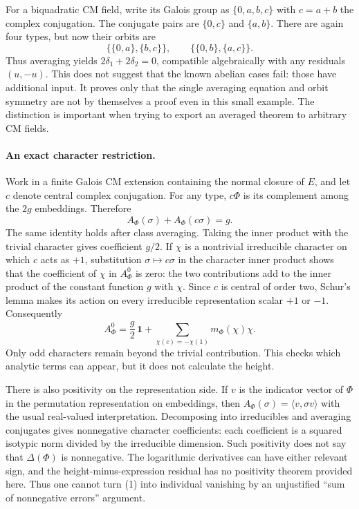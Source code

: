 \documentclass[11pt]{article}
\begin{document}
For a biquadratic CM field, write its Galois group as
$\{0,a,b,c\}$ with $c=a+b$ the complex conjugation. The conjugate
pairs are $\{0,c\}$ and $\{a,b\}$. There are again four types, but
now their orbits are
\[
 \{\{0,a\},\{b,c\}\},\qquad
 \{\{0,b\},\{a,c\}\}.                               \tag{3}
\]
Thus averaging yields $2\delta_1+2\delta_2=0$, compatible algebraically
with any residuals $(u,-u)$. This does not suggest that the known
abelian cases fail: those have additional input. It proves only that
the single averaging equation and orbit symmetry are not by themselves
a proof even in this small example. The distinction is important when
trying to export an averaged theorem to arbitrary CM fields.

\paragraph{An exact character restriction.}
Work in a finite Galois CM extension containing the normal closure of
$E$, and let $c$ denote central complex conjugation. For any type,
$c\Phi$ is its complement among the $2g$ embeddings. Therefore
\[
 A_\Phi(\sigma)+A_\Phi(c\sigma)=g.                   \tag{4}
\]
The same identity holds after class averaging. Taking the inner product
with the trivial character gives coefficient $g/2$. If $\chi$ is a
nontrivial irreducible character on which $c$ acts as $+1$, substitution
$\sigma\mapsto c\sigma$ in the character inner product shows that
the coefficient of $\chi$ in $A_\Phi^0$ is zero: the two contributions
add to the inner product of the constant function $g$ with $\chi$.
Since $c$ is central of order two, Schur's lemma makes its action on
every irreducible representation scalar $+1$ or $-1$. Consequently
\[
 A_\Phi^0=\frac g2\,\mathbf1+
 \sum_{\chi(c)=-\chi(1)}m_\Phi(\chi)\chi.            \tag{5}
\]
Only odd characters remain beyond the trivial contribution. This checks
which analytic terms can appear, but it does not calculate the height.

There is also positivity on the representation side. If $v$ is the
indicator vector of $\Phi$ in the permutation representation on
embeddings, then $A_\Phi(\sigma)=\langle v,\sigma v\rangle$ with
the usual real-valued interpretation. Decomposing into irreducibles
and averaging conjugates gives nonnegative character coefficients:
each coefficient is a squared isotypic norm divided by the irreducible
dimension. Such positivity does not say that $\Delta(\Phi)$ is
nonnegative. The logarithmic derivatives can have either relevant sign,
and the height-minus-expression residual has no positivity theorem
provided here. Thus one cannot turn (1) into individual vanishing by
an unjustified ``sum of nonnegative errors'' argument.
\end{document}
